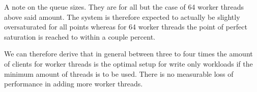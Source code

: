 
        A note on the queue sizes. They are for all but the case of 64 worker threads above said amount. The system is
        therefore expected to actually be slightly oversaturated for all points whereas for 64 worker threads the point
        of perfect saturation is reached to within a couple percent.

        We can therefore derive that in general between three to four times the amount of clients for worker threads is
        the optimal setup for write only workloads if the minimum amount of threads is to be used. There is no
        measurable loss of performance in adding more worker threads.
